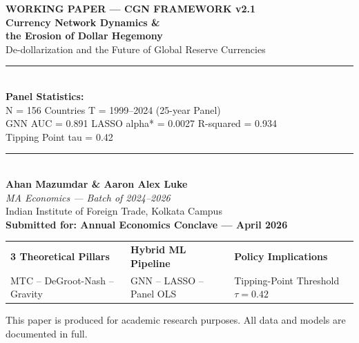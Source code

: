 \documentclass[12pt, letterpaper]{article}
\theoremstyle{definition}
\begin{document}
\begin{titlepage}
  \pagecolor{cgndark}
  \color{white}
  \centering
  \vspace*{1.5cm}
  {\fontsize{11pt}{14pt}\selectfont \textcolor{cgngold}{\textbf{WORKING PAPER --- CGN FRAMEWORK v2.1}}}\\[0.8cm]
  {\fontsize{24pt}{30pt}\selectfont
   \textbf{Currency Network Dynamics \&}\\[0.3cm]
   \textbf{the Erosion of Dollar Hegemony}}\\[0.5cm]
  {\fontsize{15pt}{20pt}\selectfont
   \textcolor{cgngold}{De-dollarization and the Future of Global Reserve Currencies}}\\[1.5cm]
  \rule{\textwidth}{0.6pt}\\[0.5cm]
  {\large \textbf{Panel Statistics:}}\\[0.3cm]
  {\normalsize
    N = 156 Countries \quad{\large$\bullet$}\quad T = 1999--2024 (25-year Panel)\\[0.2cm]
    GNN AUC = 0.891 \quad{\large$\bullet$}\quad LASSO alpha* = 0.0027
    \quad{\large$\bullet$}\quad R-squared = 0.934\\[0.2cm]
    Tipping Point tau = 0.42
  }\\[1.2cm]
  \rule{\textwidth}{0.6pt}\\[1cm]
  {\large \textbf{Ahan Mazumdar \quad \& \quad Aaron Alex Luke}}\\[0.4cm]
  {\normalsize\textit{MA Economics --- Batch of 2024--2026}}\\[0.2cm]
  {\normalsize Indian Institute of Foreign Trade, Kolkata Campus}\\[0.3cm]
  {\normalsize \textbf{Submitted for: Annual Economics Conclave --- April 2026}}\\[1.5cm]
  \begin{tabularx}{0.95\textwidth}{XXX}
    \centering\textcolor{cgngold}{\textbf{3 Theoretical Pillars}} &
    \centering\textcolor{cgngold}{\textbf{Hybrid ML Pipeline}} &
    \centering\textcolor{cgngold}{\textbf{Policy Implications}}\tabularnewline[3pt]
    \centering MTC -- DeGroot-Nash -- Gravity &
    \centering GNN -- LASSO -- Panel OLS &
    \centering Tipping-Point Threshold $\tau = 0.42$\tabularnewline
  \end{tabularx}
  \vfill
  {\small \textcolor{white!70!cgndark}{This paper is produced for academic research purposes. All data and models are documented in full.}}
\end{titlepage}
\pagecolor{white}\color{black}
\end{document}
